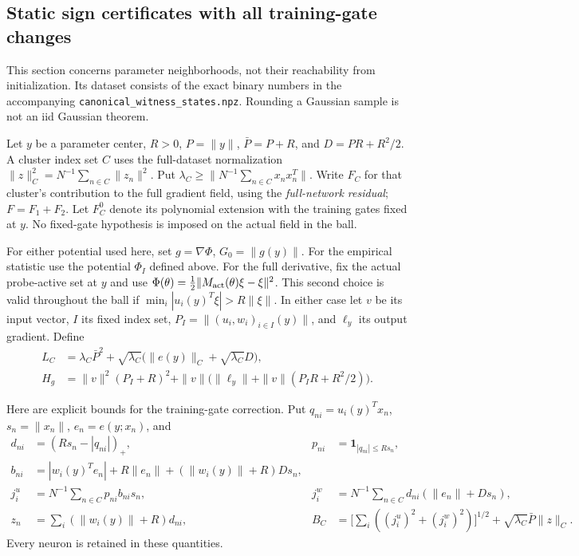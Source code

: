 \subsection{Static sign certificates with all training-gate changes}
\label{initcert:static}
This section concerns parameter neighborhoods, not their reachability from
initialization. Its dataset consists of the exact binary numbers in the
accompanying \texttt{canonical\_witness\_states.npz}. Rounding a Gaussian
sample is not an iid Gaussian theorem.

Let $y$ be a parameter center, $R>0$, $P=\|y\|$, $\bar P=P+R$, and
$D=PR+R^2/2$. A cluster index set $C$ uses the full-dataset normalization
$\|z\|_C^2=N^{-1}\sum_{n\in C}\|z_n\|^2$. Put
$\lambda_C\ge\|N^{-1}\sum_{n\in C}x_nx_n^T\|$.
Write $F_C$ for that cluster's contribution to the full gradient field,
using the \emph{full-network residual}; $F=F_1+F_2$.
Let $F_C^0$ denote its polynomial extension with the training gates fixed
at $y$. No fixed-gate hypothesis is imposed on the actual field in the ball.

For either potential used here, set $g=\nabla\Phi$, $G_0=\|g(y)\|$.
For the empirical statistic use the potential $\Phi_I$ defined above. For the full derivative, fix the actual
probe-active set at $y$ and use
$\Phi(\theta)=\frac12\|M_{\rm act}(\theta)\xi-\xi\|^2$.
This second choice is valid throughout the ball if
$\min_i|u_i(y)^T\xi|>R\|\xi\|$.
In either case let $v$ be its input vector, $I$ its fixed index set,
$P_I=\|(u_i,w_i)_{i\in I}(y)\|$, and $\ell_y$ its output gradient.
Define
\begin{align*}
 L_C&=\lambda_C\bar P^2+
 \sqrt{\lambda_C}\big(\|e(y)\|_C+\sqrt{\lambda_C}D\big),\\
 H_g&=\|v\|^2(P_I+R)^2+
 \|v\|\big(\|\ell_y\|+\|v\|(P_IR+R^2/2)\big).
\end{align*}

Here are explicit bounds for the training-gate correction. Put
$q_{ni}=u_i(y)^Tx_n$, $s_n=\|x_n\|$, $e_n=e(y;x_n)$, and
\begin{align*}
 d_{ni}&=(Rs_n-|q_{ni}|)_+,&
 p_{ni}&=\mathbf1_{|q_{ni}|\le Rs_n},\\
 b_{ni}&=|w_i(y)^Te_n|+R\|e_n\|
                 +(\|w_i(y)\|+R)Ds_n,\\
 j_i^u&=N^{-1}\sum_{n\in C}p_{ni}b_{ni}s_n,&
 j_i^w&=N^{-1}\sum_{n\in C}d_{ni}(\|e_n\|+Ds_n),\\
 z_n&=\sum_i(\|w_i(y)\|+R)d_{ni},&
 B_C&=\Big[\sum_i((j_i^u)^2+(j_i^w)^2)\Big]^{1/2}
                  +\sqrt{\lambda_C}\bar P\|z\|_C.
\end{align*}
Every neuron is retained in these quantities.

